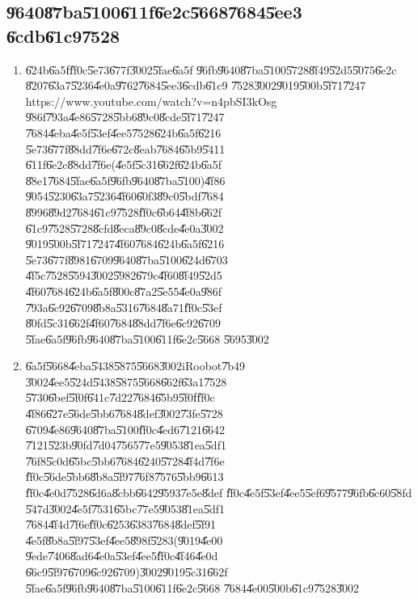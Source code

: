 \documentclass[12pt,a4paper]{article}
\begin{document}
\bigskip

\subsection{\U{9640}\U{87ba}\U{5100}\U{611f}\U{6e2c}\U{5668}\U{7684}\U{5ee3}%
\U{6cdb}\U{61c9}\U{7528}}

\begin{enumerate}
\item \U{624b}\U{6a5f}\U{ff0c}\U{5e73}\U{677f}\U{3002}\U{5fae}\U{6a5f}%
\U{96fb}\U{9640}\U{87ba}\U{5100}\U{5728}\U{8f49}\U{52d5}\U{5075}\U{6e2c}%
\U{8207}\U{63a7}\U{5236}\U{4e0a}\U{9762}\U{7684}\U{5ee3}\U{6cdb}\U{61c9}%
\U{7528}\U{3002}\U{9019}\U{500b}\U{5f71}\U{7247}\newline
https://www.youtube.com/watch?v=n4pbSI3kOsg\newline
\U{986f}\U{793a}\U{4e86}\U{5728}\U{5bb6}\U{89c0}\U{8cde}\U{5f71}\U{7247}%
\U{7684}\U{4eba}\U{4e5f}\U{53ef}\U{4ee5}\U{7528}\U{624b}\U{6a5f}\U{6216}%
\U{5e73}\U{677f}\U{88dd}\U{7f6e}\U{672c}\U{8eab}\U{7684}\U{65b9}\U{5411}%
\U{611f}\U{6e2c}\U{88dd}\U{7f6e}(\U{4e5f}\U{5c31}\U{662f}\U{624b}\U{6a5f}%
\U{88e1}\U{7684}\U{5fae}\U{6a5f}\U{96fb}\U{9640}\U{87ba}\U{5100})\U{4f86}%
\U{9054}\U{5230}\U{63a7}\U{5236}\U{4f60}\U{60f3}\U{89c0}\U{5bdf}\U{7684}%
\U{8996}\U{89d2}\U{7684}\U{61c9}\U{7528}\U{ff0c}\U{6b64}\U{4f8b}\U{662f}%
\U{61c9}\U{7528}\U{5728}\U{8cfd}\U{8eca}\U{89c0}\U{8cde}\U{4e0a}\U{3002}%
\U{9019}\U{500b}\U{5f71}\U{7247}\U{4f60}\U{7684}\U{624b}\U{6a5f}\U{6216}%
\U{5e73}\U{677f}\U{8981}\U{6709}\U{9640}\U{87ba}\U{5100}\U{624d}\U{6703}%
\U{4f5c}\U{7528}\U{5594}\U{3002}\U{5982}\U{679c}\U{4f60}\U{8f49}\U{52d5}%
\U{4f60}\U{7684}\U{624b}\U{6a5f}\U{800c}\U{87a2}\U{5e55}\U{4e0a}\U{986f}%
\U{793a}\U{6c92}\U{6709}\U{8b8a}\U{5316}\U{7684}\U{8a71}\U{ff0c}\U{53ef}%
\U{80fd}\U{5c31}\U{662f}\U{4f60}\U{7684}\U{88dd}\U{7f6e}\U{6c92}\U{6709}%
\U{5fae}\U{6a5f}\U{96fb}\U{9640}\U{87ba}\U{5100}\U{611f}\U{6e2c}\U{5668}%
\U{5695}\U{3002}

\item \U{6a5f}\U{5668}\U{4eba}\U{5438}\U{5875}\U{5668}\U{3002}iRoobot\U{7b49}%
\U{3002}\U{4ee5}\U{524d}\U{5438}\U{5875}\U{5668}\U{662f}\U{63a1}\U{7528}%
\U{5730}\U{6bef}\U{5f0f}\U{641c}\U{7d22}\U{7684}\U{65b9}\U{5f0f}\U{ff0c}%
\U{4f86}\U{627e}\U{56de}\U{5bb6}\U{7684}\U{8def}\U{3002}\U{73fe}\U{5728}%
\U{6709}\U{4e86}\U{9640}\U{87ba}\U{5100}\U{ff0c}\U{4ed6}\U{7121}\U{6642}%
\U{7121}\U{523b}\U{90fd}\U{7d04}\U{7565}\U{77e5}\U{9053}\U{81ea}\U{5df1}%
\U{76f8}\U{5c0d}\U{65bc}\U{5bb6}\U{7684}\U{6240}\U{5728}\U{4f4d}\U{7f6e}%
\U{ff0c}\U{56de}\U{5bb6}\U{8b8a}\U{5f97}\U{76f8}\U{7576}\U{5bb9}\U{6613}%
\U{ff0c}\U{4e0d}\U{7528}\U{6d6a}\U{8cbb}\U{6642}\U{9593}\U{7e5e}\U{8def}%
\U{ff0c}\U{4e5f}\U{53ef}\U{4ee5}\U{5ef6}\U{9577}\U{96fb}\U{6c60}\U{58fd}%
\U{547d}\U{3002}\U{4e5f}\U{7531}\U{65bc}\U{77e5}\U{9053}\U{81ea}\U{5df1}%
\U{7684}\U{4f4d}\U{7f6e}\U{ff0c}\U{6253}\U{6383}\U{7684}\U{8def}\U{5f91}%
\U{4e5f}\U{8b8a}\U{5f97}\U{53ef}\U{4ee5}\U{898f}\U{5283}(\U{9019}\U{4e00}%
\U{9ede}\U{7406}\U{8ad6}\U{4e0a}\U{53ef}\U{4ee5}\U{ff0c}\U{4f46}\U{4e0d}%
\U{66c9}\U{5f97}\U{6709}\U{6c92}\U{6709})\U{3002}\U{9019}\U{5c31}\U{662f}%
\U{5fae}\U{6a5f}\U{96fb}\U{9640}\U{87ba}\U{5100}\U{611f}\U{6e2c}\U{5668}%
\U{7684}\U{4e00}\U{500b}\U{61c9}\U{7528}\U{3002}


\end{enumerate}
\end{document}
